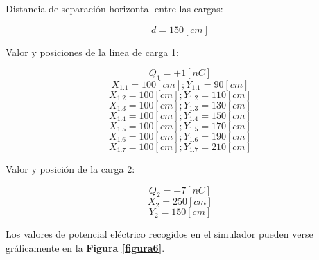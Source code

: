 \documentclass[letter,11pt]{article}
\begin{document}
Distancia de separación horizontal entre las cargas:

\begin{equation*}
    d = 150 [cm]
\end{equation*}

Valor y posiciones de la linea de carga 1:

\begin{equation*}
    Q_1 = +1 [nC]
\end{equation*}
\begin{equation*}
    X_{1.1} = 100 [cm]; Y_{1.1} = 90 [cm]
\end{equation*}
\begin{equation*}
    X_{1.2} = 100 [cm]; Y_{1.2} = 110 [cm]
\end{equation*}
\begin{equation*}
    X_{1.3} = 100 [cm]; Y_{1.3} = 130 [cm]
\end{equation*}
\begin{equation*}
    X_{1.4} = 100 [cm]; Y_{1.4} = 150 [cm]
\end{equation*}
\begin{equation*}
    X_{1.5} = 100 [cm]; Y_{1.5} = 170 [cm]
\end{equation*}
\begin{equation*}
    X_{1.6} = 100 [cm]; Y_{1.6} = 190 [cm]
\end{equation*}
\begin{equation*}
    X_{1.7} = 100 [cm]; Y_{1.7} = 210 [cm]
\end{equation*}

Valor y posición de la carga 2:

\begin{equation*}
    Q_2 = -7 [nC]
\end{equation*}
\begin{equation*}
    X_2 = 250 [cm]
\end{equation*}
\begin{equation*}
    Y_2 = 150 [cm]
\end{equation*}

Los valores de potencial eléctrico recogidos en el simulador pueden verse
gráficamente en la \textbf{Figura \ref{figura6}}.
\end{document}
